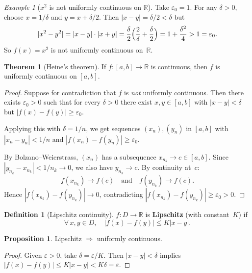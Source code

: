 \documentclass[12pt,a4paper,openany]{book}
\theoremstyle{definition}
\newtheorem{definition}{Definition}[chapter]
\newtheorem{theorem}{Theorem}[chapter]
\newtheorem{proposition}{Proposition}[chapter]
\theoremstyle{remark}
\newtheorem{example}{Example}[chapter]
\begin{document}
\begin{example}[$x^2$ is not uniformly continuous on $\mathbb{R}$]
\label{ex:x2-not-uc}
Take $\varepsilon_0=1$.  For any $\delta>0$, choose $x=1/\delta$ and
$y=x+\delta/2$.  Then $|x-y|=\delta/2<\delta$ but
\[
  |x^2-y^2| = |x-y|\cdot|x+y| = \frac{\delta}{2}\Bigl(\frac{2}{\delta}
  +\frac{\delta}{2}\Bigr) = 1+\frac{\delta^2}{4} > 1 = \varepsilon_0.
\]
So $f(x)=x^2$ is not uniformly continuous on~$\mathbb{R}$.
\end{example}

\begin{theorem}[Heine's theorem]\label{thm:heine-uc}
If $f\colon[a,b]\to\mathbb{R}$ is continuous, then $f$ is
uniformly continuous on $[a,b]$.
\end{theorem}

\begin{proof}
Suppose for contradiction that $f$ is \emph{not} uniformly continuous.
Then there exists $\varepsilon_0>0$ such that for every $\delta>0$ there
exist $x,y\in[a,b]$ with $|x-y|<\delta$ but
$|f(x)-f(y)|\ge\varepsilon_0$.

Applying this with $\delta=1/n$, we get sequences $(x_n),(y_n)$ in
$[a,b]$ with $|x_n-y_n|<1/n$ and $|f(x_n)-f(y_n)|\ge\varepsilon_0$.

By Bolzano--Weierstrass, $(x_n)$ has a subsequence
$x_{n_k}\to c\in[a,b]$.  Since $|y_{n_k}-x_{n_k}|<1/n_k\to 0$,
we also have $y_{n_k}\to c$.  By continuity at~$c$:
\[
  f(x_{n_k})\to f(c) \quad\text{and}\quad f(y_{n_k})\to f(c).
\]
Hence $|f(x_{n_k})-f(y_{n_k})|\to 0$, contradicting
$|f(x_{n_k})-f(y_{n_k})|\ge\varepsilon_0>0$.
\end{proof}

\begin{definition}[Lipschitz continuity]\label{def:lipschitz}
$f\colon D\to\mathbb{R}$ is \textbf{Lipschitz} (with constant~$K$) if
\[
  \forall\, x,y\in D,\quad |f(x)-f(y)|\le K|x-y|.
\]
\end{definition}

\begin{proposition}\label{prop:lip-implies-uc}
Lipschitz $\Longrightarrow$ uniformly continuous.
\end{proposition}

\begin{proof}
Given $\varepsilon>0$, take $\delta=\varepsilon/K$.
Then $|x-y|<\delta$ implies $|f(x)-f(y)|\le K|x-y|<K\delta=\varepsilon$.
\end{proof}
\end{document}
